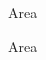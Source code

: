 \documentclass[a4paper]{article}
\begin{document}
\printGenericVSLHeader
\begin{center}
\begin{vsltext}{3cm}{3.5cm}

Area \AreaA

\vspace{3cm}

Area \AreaB

\end{vsltext}

\end{center}
\end{document}
